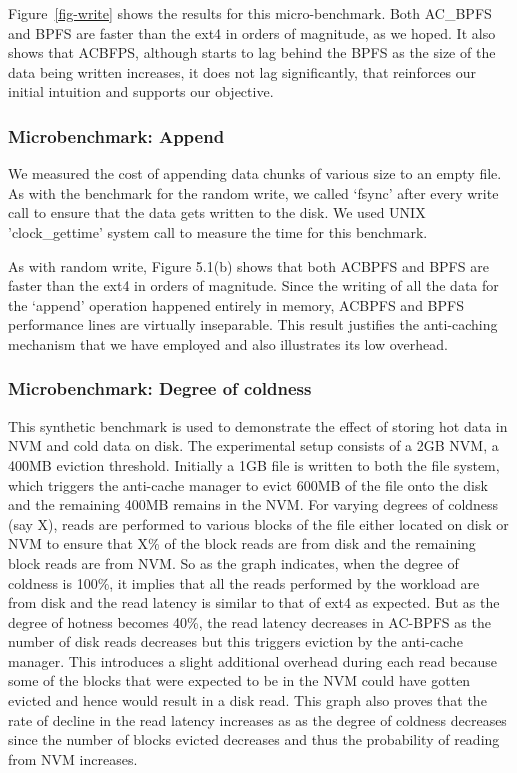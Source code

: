 Figure~\ref{fig-write} shows the results for this micro-benchmark. Both AC\_BPFS and BPFS are faster than the ext4 in orders of magnitude, as we hoped. It also shows that AC\-BFPS, although starts to lag behind the BPFS as the size of the data being written increases, it does not lag significantly, that reinforces our initial intuition and supports our objective.



\subsubsection{Microbenchmark: Append}
We measured the cost of appending data chunks of various size to an empty file. As with the benchmark for the random write, we called ‘fsync’ after every write call to ensure that the data gets written to the disk. We used UNIX 'clock\_gettime' system call to measure the time for this benchmark.

As with random write, Figure 5.1(b) shows that both AC\-BPFS and BPFS are faster than the ext4 in orders of magnitude. Since the writing of all the data for the ‘append’ operation happened entirely in memory, AC\-BPFS and BPFS performance lines are virtually inseparable. This result justifies the anti-caching mechanism that we have employed and also illustrates its low overhead.


\subsubsection{Microbenchmark: Degree of coldness}
This synthetic benchmark is used to demonstrate the effect of storing hot data in NVM and cold data on disk. The experimental setup consists of a 2GB NVM, a 400MB eviction threshold. Initially a 1GB file is written to both the file system, which triggers the anti-cache manager to evict 600MB of the file onto the disk and the remaining 400MB remains in the NVM. For varying degrees of coldness (say X), reads are performed to various blocks of the file either located on disk or NVM to ensure that X\% of the block reads are from disk and the remaining block reads are from NVM. So as the graph indicates, when the degree of coldness is 100\%, it implies that all the reads performed by the workload are from disk and the read latency is similar to that of ext4 as expected. But as the degree of hotness becomes 40\%, the read latency decreases in AC-BPFS as the number of disk reads decreases but this triggers eviction by the anti-cache manager. This introduces a slight additional overhead during each read because some of the blocks that were expected to be in the NVM could have gotten evicted and hence would result in a disk read. This graph also proves that the rate of decline in the read latency increases as as the degree of coldness decreases since the number of blocks evicted decreases and thus the probability of reading from NVM increases.


